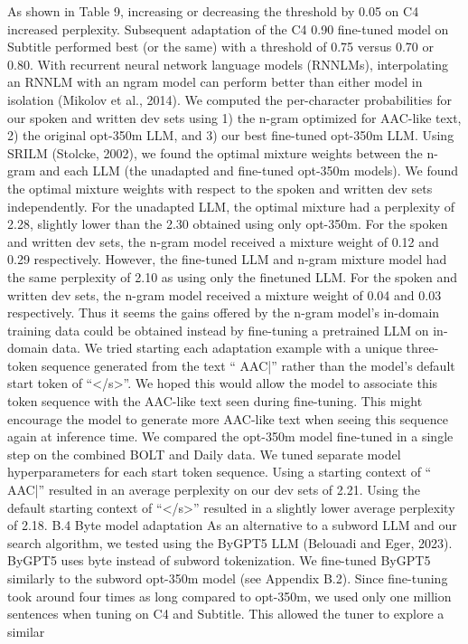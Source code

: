 As shown in Table 9, increasing or decreasing
the threshold by 0.05 on C4 increased perplexity.
Subsequent adaptation of the C4 0.90 fine-tuned
model on Subtitle performed best (or the same)
with a threshold of 0.75 versus 0.70 or 0.80.
With recurrent neural network language models
(RNNLMs), interpolating an RNNLM with an ngram model can perform better than either model
in isolation (Mikolov et al., 2014). We computed
the per-character probabilities for our spoken and
written dev sets using 1) the n-gram optimized
for AAC-like text, 2) the original opt-350m LLM,
and 3) our best fine-tuned opt-350m LLM. Using
SRILM (Stolcke, 2002), we found the optimal mixture weights between the n-gram and each LLM
(the unadapted and fine-tuned opt-350m models).
We found the optimal mixture weights with respect
to the spoken and written dev sets independently.
For the unadapted LLM, the optimal mixture had
a perplexity of 2.28, slightly lower than the 2.30
obtained using only opt-350m. For the spoken and
written dev sets, the n-gram model received a mixture weight of 0.12 and 0.29 respectively. However,
the fine-tuned LLM and n-gram mixture model had
the same perplexity of 2.10 as using only the finetuned LLM. For the spoken and written dev sets,
the n-gram model received a mixture weight of
0.04 and 0.03 respectively. Thus it seems the gains
offered by the n-gram model’s in-domain training
data could be obtained instead by fine-tuning a pretrained LLM on in-domain data.
We tried starting each adaptation example with
a unique three-token sequence generated from the
text “ AAC|” rather than the model’s default start
token of “</s>”. We hoped this would allow the
model to associate this token sequence with the
AAC-like text seen during fine-tuning. This might
encourage the model to generate more AAC-like
text when seeing this sequence again at inference
time. We compared the opt-350m model fine-tuned
in a single step on the combined BOLT and Daily
data. We tuned separate model hyperparameters for
each start token sequence. Using a starting context
of “ AAC|” resulted in an average perplexity on
our dev sets of 2.21. Using the default starting context of “</s>” resulted in a slightly lower average
perplexity of 2.18.
B.4 Byte model adaptation
As an alternative to a subword LLM and our search
algorithm, we tested using the ByGPT5 LLM (Belouadi and Eger, 2023). ByGPT5 uses byte instead
of subword tokenization. We fine-tuned ByGPT5
similarly to the subword opt-350m model (see Appendix B.2). Since fine-tuning took around four
times as long compared to opt-350m, we used only
one million sentences when tuning on C4 and Subtitle. This allowed the tuner to explore a similar
